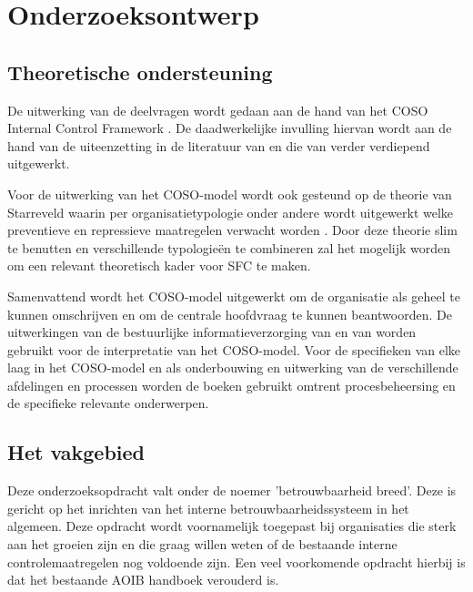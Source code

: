 \chapter{Onderzoeksontwerp}

\section{Theoretische ondersteuning}
De uitwerking van de deelvragen wordt gedaan aan de hand van het COSO Internal Control Framework \citep{COSOsummery}. De daadwerkelijke invulling hiervan wordt aan de hand van de uiteenzetting in de literatuur van \citet{bivpraktijk} en die van \citet{bivperspectief} verder verdiepend uitgewerkt. 

Voor de uitwerking van het COSO-model wordt ook gesteund op de theorie van Starreveld waarin per organisatietypologie onder andere wordt uitgewerkt welke preventieve en repressieve maatregelen verwacht worden \citep{jans,financiering,buunk}. Door deze theorie slim te benutten en verschillende typologieën te combineren zal het mogelijk worden om een relevant theoretisch kader voor SFC te maken. 

Samenvattend wordt het COSO-model uitgewerkt om de organisatie als geheel te kunnen omschrijven en om de centrale hoofdvraag te kunnen beantwoorden. De uitwerkingen van de bestuurlijke informatieverzorging van \citet{bivperspectief} en van \citet{bivpraktijk} worden gebruikt voor de interpretatie van het COSO-model. Voor de specifieken van elke laag in het COSO-model en als onderbouwing en uitwerking van de verschillende afdelingen en processen worden de boeken gebruikt omtrent procesbeheersing en de specifieke relevante onderwerpen. \citep{internebeheersing,jans,financiering,buunk}

\section{Het vakgebied}
Deze onderzoeksopdracht valt onder de noemer 'betrouwbaarheid breed'. Deze is gericht op het inrichten van het interne betrouwbaarheidssysteem in het algemeen. Deze opdracht wordt voornamelijk toegepast bij organisaties die sterk aan het groeien zijn en die graag willen weten of de bestaande interne controlemaatregelen nog voldoende zijn. Een veel voorkomende opdracht hierbij is dat het bestaande AOIB handboek verouderd is. \citep{bivpraktijk}


\newpage
